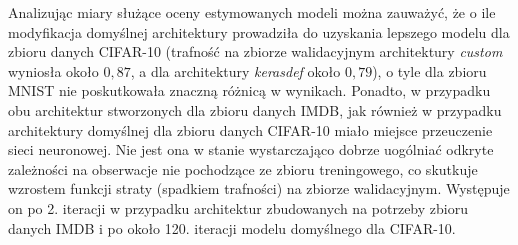 \documentclass[12pt,a4paper,twoside]{article}
\begin{document}
Analizując miary służące oceny estymowanych modeli można zauważyć, że o ile modyfikacja domyślnej architektury prowadziła do uzyskania lepszego modelu dla zbioru danych CIFAR-10 (trafność na zbiorze walidacyjnym architektury \textit{custom} wyniosła około $0,87$, a dla architektury \textit{kerasdef} około $0,79$), o tyle dla zbioru MNIST nie poskutkowała znaczną różnicą w wynikach. Ponadto, w przypadku obu architektur stworzonych dla zbioru danych IMDB, jak również w przypadku architektury domyślnej dla zbioru danych CIFAR-10 miało miejsce przeuczenie sieci neuronowej. Nie jest ona w stanie wystarczająco dobrze uogólniać odkryte zależności na obserwacje nie pochodzące ze zbioru treningowego, co skutkuje wzrostem funkcji straty (spadkiem trafności) na zbiorze walidacyjnym. Występuje on po 2. iteracji w przypadku architektur zbudowanych na potrzeby zbioru danych IMDB i po około 120. iteracji modelu domyślnego dla CIFAR-10.
\noindent
\end{document}
